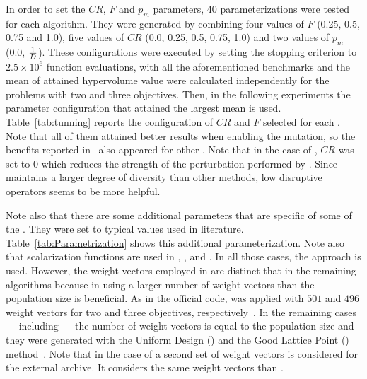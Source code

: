 In order to set the $CR$, $F$ and $p_m$ parameters, 40 parameterizations were tested for each algorithm.
%
They were generated by combining four values of $F$ (0.25, 0.5, 0.75 and 1.0), five values of $CR$ (0.0, 0.25, 0.5, 0.75, 1.0) 
and two values of $p_m$ (0.0, $1\over{D}$).
%
These configurations were executed by setting the stopping criterion to $2.5 \times 10^{6}$ function evaluations, 
with all the aforementioned benchmarks and the mean of attained hypervolume value were calculated independently
for the problems with two and three objectives.
%
Then, in the following experiments the parameter configuration that attained the largest mean is used.
%
Table~\ref{tab:tunning} reports the configuration of $CR$ and $F$ selected for each \MOEA{}.
%
Note that all of them attained better results when enabling the mutation, so the benefits reported in~\cite{zhang2009performance}
also appeared for other \MOEAS{}.
%
Note that in the case of \AVSDMOEAD{}, $CR$ was set to 0 which reduces the strength of the perturbation performed
by \DE{}.
%
Since \AVSDMOEAD{} maintains a larger degree of diversity than other methods, low disruptive
operators seems to be more helpful.



Note also that there are some additional parameters that are specific of some of the \MOEAS{}.
%
They were set to typical values used in literature. 
%
Table~\ref{tab:Parametrization} shows this additional parameterization.
%
Note also that scalarization functions are used in \MOEADDE{}, \RMOEA{}, \NSGAIII{} and \AVSDMOEAD{}.
%
In all those cases, the \ASF{} approach is used.
%
However, the weight vectors employed in \RMOEA{} are distinct that in the remaining algorithms because in \RMOEA{} using
a larger number of weight vectors than the population size is beneficial.
%
As in the official code, \RMOEA{} was applied with $501$ and $496$ weight vectors for two and three objectives, 
respectively~\cite{trautmann2013r2}.
%
In the remaining cases --- including \AVSDMOEAD{} --- the number of weight vectors is equal to the population size and they were generated
with the Uniform Design (\UD{}) and the Good Lattice Point (\GLP{}) method~\cite{tan2013moea1, tan2013moea2}.
%
Note that in the case of \AVSDMOEAD{} a second set of weight vectors is considered for the external archive.
%
It considers the same weight vectors than \RMOEA{}.

